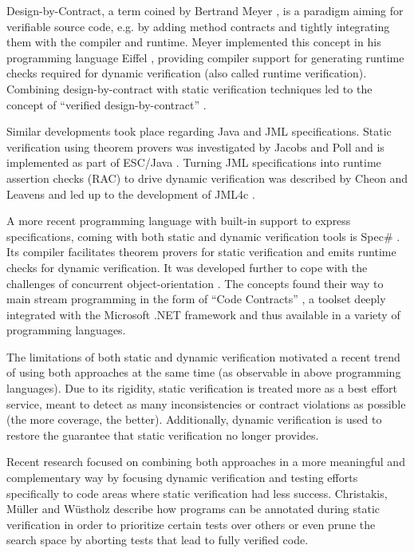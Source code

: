 Design-by-Contract, a term coined by Bertrand Meyer \cite{meyer2002design}, is a paradigm aiming for verifiable source code, e.g. by adding method contracts and tightly integrating them with the compiler and runtime.
Meyer implemented this concept in his programming language Eiffel \cite{meyer1988eiffel}, providing compiler support for generating runtime checks required for dynamic verification (also called runtime verification).
Combining design-by-contract with static verification techniques led to the concept of “verified design-by-contract” \cite{crocker2004safe}.

Similar developments took place regarding Java and JML specifications.
Static verification using theorem provers was investigated by Jacobs and Poll \cite{jacobs2001logic} and is implemented as part of ESC/Java \cite{nelson2004extended}.
Turning JML specifications into runtime assertion checks (RAC) to drive dynamic verification was described by Cheon and Leavens \cite{cheon2002runtime} and led up to the development of JML4c \cite{sarcar2010new}.

A more recent programming language with built-in support to express specifications, coming with both static and dynamic verification tools is Spec\# \cite{the-spec-programming-system-an-overview}.
Its compiler facilitates theorem provers for static verification and emits runtime checks for dynamic verification.
It was developed further to cope with the challenges of concurrent object-orientation \cite{a-statically-verifiable-programming-model-for-concurrent-object-oriented-programs}.
The concepts found their way to main stream programming in the form of “Code Contracts” \cite{embedded-contract-languages}, a toolset deeply integrated with the Microsoft .NET framework and thus available in a variety of programming languages.

The limitations of both static and dynamic verification motivated a recent trend of using both approaches at the same time (as observable in above programming languages).
Due to its rigidity, static verification is treated more as a best effort service, meant to detect as many inconsistencies or contract violations as possible (the more coverage, the better).
Additionally, dynamic verification is used to restore the guarantee that static verification no longer provides.

Recent research focused on combining both approaches in a more meaningful and complementary way by focusing dynamic verification and testing efforts specifically to code areas where static verification had less success.
Christakis, Müller and Wüstholz \cite{ChristakisMuellerWuestholz16} describe how programs can be annotated during static verification in order to prioritize certain tests over others or even prune the search space by aborting tests that lead to fully verified code.

